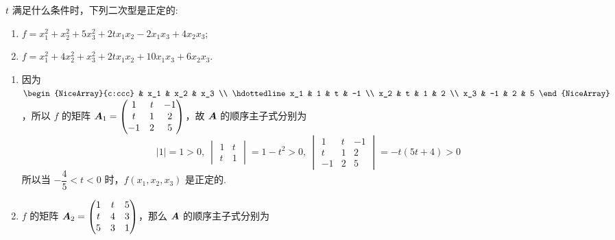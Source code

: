 \begin{example}
    $t$ 满足什么条件时，下列二次型是正定的:
    \begin{enumerate}[label=(\arabic{*})]
        \item $f=x_1^2+x_2^2+5x_3^2+2tx_1x_2-2x_1x_3+4x_2x_3$;
        \item $f=x_1^2+4x_2^2+x_3^2+2tx_1x_2+10x_1x_3+6x_2x_3$.
    \end{enumerate}
\end{example}
\begin{solution}
    \begin{enumerate}[label=(\arabic{*})]
        \item 因为 $\begin{NiceArray}{c:ccc}
            & x_1 & x_2 & x_3 \\ \hdottedline
                          x_1 & 1   & t   & -1  \\
                          x_2 & t   & 1   & 2   \\
                          x_3 & -1  & 2   & 5
        \end{NiceArray}$，所以 $f$ 的矩阵 $\vb*{A}_1=\begin{pmatrix}
                      1  & t & -1 \\
                      t  & 1 & 2  \\
                      -1 & 2 & 5
                  \end{pmatrix}$，故 $\vb*{A}$ 的顺序主子式分别为
              $$|1|=1>0,~\begin{vmatrix}
                      1 & t \\
                      t & 1
                  \end{vmatrix}=1-t^2>0,~\begin{vmatrix}
                      1  & t & -1 \\
                      t  & 1 & 2  \\
                      -1 & 2 & 5
                  \end{vmatrix}=-t(5t+4)>0$$
              所以当 $-\dfrac{4}{5}<t<0$ 时，$f(x_1,x_2,x_3)$ 是正定的.
        \item $f$ 的矩阵 $\vb*{A}_2=\begin{pmatrix}
                      1 & t & 5 \\
                      t & 4 & 3 \\
                      5 & 3 & 1
                  \end{pmatrix}$，那么 $\vb*{A}$ 的顺序主子式分别为

\end{enumerate}
\end{solution}
